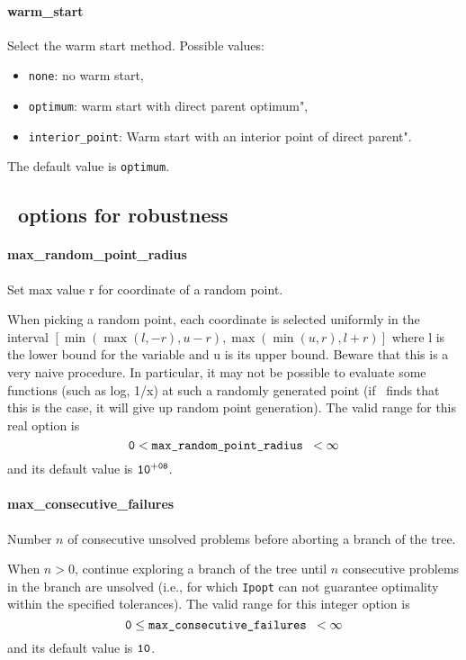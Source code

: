\paragraph{warm\_start}
Select the warm start method. Possible values:
\begin{itemize}
 \item {\tt none}: no warm start,
\item {\tt optimum}: warm start with direct parent optimum",
\item {\tt interior\_point}: Warm start with an interior point of direct parent".
\end{itemize}
The default value is {\tt optimum}.

\subsection{\Bonmin\ options for robustness}

\paragraph{max\_random\_point\_radius}
Set max value r for coordinate of a random point.

 When picking a random point, each coordinate is selected uniformly
in the interval $[\min(\max(l,-r),u-r),
\max(\min(u,r),l+r)]$ where l is the lower bound
for the variable and u is its upper bound.
Beware that this is a very naive procedure. In particular,
it may not be possible to evaluate some functions (such as log, 1/x)
at such a randomly generated point (if \Bonmin\  finds that this is the case,
it will give up random point generation).
The valid range for this real option is
$${\tt 0} <  \hbox{\tt max\_random\_point\_radius } <  \infty$$
and its default value is ${\tt 10^{+08}}$.


\paragraph{max\_consecutive\_failures}
Number $n$ of consecutive unsolved problems before aborting
a branch of the tree.

 When $n > 0$, continue exploring a branch of the
tree until $n$ consecutive problems in the branch
are unsolved (i.e., for
which {\tt Ipopt} can not guarantee optimality within
the specified tolerances). The valid range for this integer option is
$${\tt 0} \le \hbox{\tt max\_consecutive\_failures } <  \infty$$
and its default value is ${\tt 10}$.


